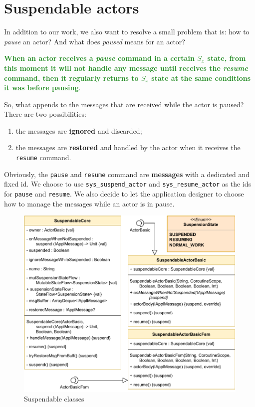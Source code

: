 \section{Suspendable actors}

In addition to our work, we also want to resolve a small problem that is: how to \textit{pause} an actor? And what does \textit{paused} means for an actor?

\textcolor{ForestGreen}{\textbf{When an actor receives a \textit{pause} command in a certain $S_x$ state, from this moment it will not handle any message until receives the \textit{resume} command, then it regularly returns to $S_x$ state at the same conditions it was before pausing}}.

So, what appends to the messages that are received while the actor is paused? There are two possibilities:
\begin{enumerate}
	\item the messages are \textbf{ignored} and discarded;
	\item the messages are \textbf{restored} and handled by the actor when it receives the \texttt{resume} command.
\end{enumerate}

Obviously, the \texttt{pause} and \texttt{resume} command are \textbf{messages} with a dedicated and fixed id. We choose to use \texttt{sys\_suspend\_actor} and \texttt{sys\_resume\_actor} as the ids for \texttt{pause} and \texttt{resume}.
We also decide to let the application designer to choose how to manage the messages while an actor is in pause.

\begin{figure}[h!]
	\centering
	\includegraphics[width=\textwidth]{img/[UML]Suspendable}
	\caption{Suspendable classes}
	\label{fig::suspendable}
\end{figure}

